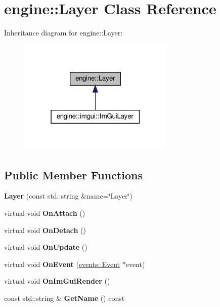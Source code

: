 \hypertarget{classengine_1_1Layer}{}\section{engine\+:\+:Layer Class Reference}
\label{classengine_1_1Layer}


Inheritance diagram for engine\+:\+:Layer\+:
\nopagebreak
\begin{figure}[H]
\begin{center}
\leavevmode
\includegraphics[width=211pt]{classengine_1_1Layer__inherit__graph}
\end{center}
\end{figure}
\subsection*{Public Member Functions}
\begin{DoxyCompactItemize}
\item
\mbox{\label{classengine_1_1Layer_a7c94872b9fc69fd1695e21319c6ae495}}
{\bfseries Layer} (const std\+::string \&name=\char`\"{}Layer\char`\"{})
\item
\mbox{\label{classengine_1_1Layer_a9a2c2492698442cc0ea6e8eb68410042}}
virtual void {\bfseries On\+Attach} ()
\item
\mbox{\label{classengine_1_1Layer_a8677643ecc3446706ed17f4d432f1555}}
virtual void {\bfseries On\+Detach} ()
\item
\mbox{\label{classengine_1_1Layer_ad0d270c6ec083e85b33f786ef381e083}}
virtual void {\bfseries On\+Update} ()
\item
\mbox{\label{classengine_1_1Layer_a586fe29f7ae93c7c0334b3eb86ee6d3f}}
virtual void {\bfseries On\+Event} (\hyperlink{classengine_1_1events_1_1Event}{events\+::\+Event} $\ast$event)
\item
\mbox{\label{classengine_1_1Layer_afbc888c1ec284408b8664981c905fce4}}
virtual void {\bfseries On\+Im\+Gui\+Render} ()
\item
\mbox{\label{classengine_1_1Layer_a2a511e798109a6b06a0fe8b0e4af9c0f}}
const std\+::string \& {\bfseries Get\+Name} () const
\end{DoxyCompactItemize}
